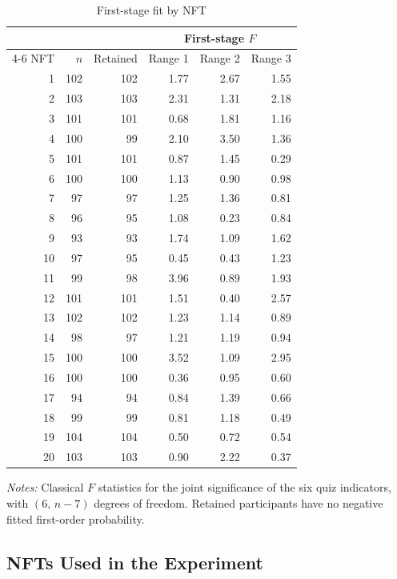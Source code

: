 \documentclass[12pt,reqno]{amsart}
\begin{document}
\begin{table}[htbp]
\centering\small\caption{First-stage fit by NFT}\label{tab:firststage}
\begin{tabular}{rrrrrr}
\toprule
 & & & \multicolumn{3}{c}{First-stage $F$} \\
\cmidrule(lr){4-6}
NFT & $n$ & Retained & Range 1 & Range 2 & Range 3 \\
\midrule
1 & 102 & 102 & 1.77 & 2.67 & 1.55 \\
2 & 103 & 103 & 2.31 & 1.31 & 2.18 \\
3 & 101 & 101 & 0.68 & 1.81 & 1.16 \\
4 & 100 & 99 & 2.10 & 3.50 & 1.36 \\
5 & 101 & 101 & 0.87 & 1.45 & 0.29 \\
6 & 100 & 100 & 1.13 & 0.90 & 0.98 \\
7 & 97 & 97 & 1.25 & 1.36 & 0.81 \\
8 & 96 & 95 & 1.08 & 0.23 & 0.84 \\
9 & 93 & 93 & 1.74 & 1.09 & 1.62 \\
10 & 97 & 95 & 0.45 & 0.43 & 1.23 \\
11 & 99 & 98 & 3.96 & 0.89 & 1.93 \\
12 & 101 & 101 & 1.51 & 0.40 & 2.57 \\
13 & 102 & 102 & 1.23 & 1.14 & 0.89 \\
14 & 98 & 97 & 1.21 & 1.19 & 0.94 \\
15 & 100 & 100 & 3.52 & 1.09 & 2.95 \\
16 & 100 & 100 & 0.36 & 0.95 & 0.60 \\
17 & 94 & 94 & 0.84 & 1.39 & 0.66 \\
18 & 99 & 99 & 0.81 & 1.18 & 0.49 \\
19 & 104 & 104 & 0.50 & 0.72 & 0.54 \\
20 & 103 & 103 & 0.90 & 2.22 & 0.37 \\
\bottomrule
\end{tabular}
\begin{minipage}{.8\textwidth}\footnotesize
\emph{Notes:} Classical $F$ statistics for the joint significance of the six quiz indicators, with $(6,\,n-7)$ degrees of freedom. Retained participants have no negative fitted first-order probability.
\end{minipage}
\end{table}

\subsection{NFTs Used in the Experiment}
\end{document}
